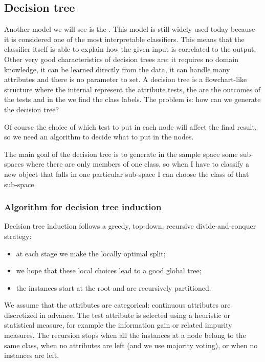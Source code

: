 \subsection{Decision tree}

Another model we will see is the . This model is still widely used today because it is considered one of the most interpretable classifiers. This means that the classifier itself is able to explain how the given input is correlated to the output. Other very good characteristics of decision trees are: it requires no domain knowledge, it can be learned directly from the data, it can handle many attributes and there is no parameter to set. A decision tree is a flowchart-like structure where the internal  represent the attribute tests, the  are the outcomes of the tests and in the  we find the class labels. The problem is: how can we generate the decision tree?

Of course the choice of which test to put in each node will affect the final result, so we need an algorithm to decide what to put in the nodes.

The main goal of the decision tree is to generate in the sample space some sub-spaces where there are only members of one class, so when I have to classify a new object that falls in one particular sub-space I can choose the class of that sub-space.

\subsubsection{Algorithm for decision tree induction}

Decision tree induction follows a greedy, top-down, recursive divide-and-conquer strategy:
\begin{itemize}
  \item at each stage we make the locally optimal split;
  \item we hope that these local choices lead to a good global tree;
  \item the instances start at the root and are recursively partitioned.
\end{itemize}
We assume that the attributes are categorical: continuous attributes are discretized in advance. The test attribute is selected using a heuristic or statistical measure, for example the information gain or related impurity measures. The recursion stops when all the instances at a node belong to the same class, when no attributes are left (and we use majority voting), or when no instances are left.

